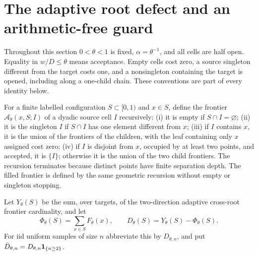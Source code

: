 \documentclass[11pt]{article}
\numberwithin{equation}{section}
\newcommand{\1}{\mathbf 1}\newcommand{\F}{\mathcal F}\newcommand{\D}{\mathcal D}
\begin{document}
\section{The adaptive root defect and an arithmetic-free guard}
\label{sec:adaptive-guard-dossier}

Throughout this section $0<\theta<1$ is fixed, $\alpha=\theta^{-1}$, and
all cells are half open.  Equality in $w/D\leq\theta$ means acceptance.  Empty
cells cost zero, a source singleton different from the target costs one, and
a nonsingleton containing the target is opened, including along a one-child
chain.  These conventions are part of every identity below.

For a finite labelled configuration $S\subset[0,1)$ and $x\in S$, define the
frontier $\mathcal A_\theta(x,S;I)$ of a dyadic source cell $I$ recursively:
(i) it is empty if $S\cap I=\varnothing$; (ii) it is the singleton $I$ if
$S\cap I$ has one element different from $x$; (iii) if $I$ contains $x$, it
is the union of the frontiers of the children, with the leaf containing only
$x$ assigned cost zero; (iv) if $I$ is disjoint from $x$, occupied by at least
two points, and accepted, it is $\{I\}$; otherwise it is the union of the two
child frontiers.  The recursion terminates because distinct points have finite
separation depth.  The filled frontier is defined by the same geometric
recursion without empty or singleton stopping.

Let $Y_\theta(S)$ be the sum, over targets, of the two-direction adaptive
cross-root frontier cardinality, and let
\begin{equation}
 \Phi_\theta(S)=\sum_{x\in S}F_\theta(x),\qquad
 D_\theta(S)=Y_\theta(S)-\Phi_\theta(S).                 \label{eq:defect-def}
\end{equation}
For iid uniform samples of size $n$ abbreviate this by $D_{\theta,n}$, and put
$\bar D_{\theta,n}=D_{\theta,n}{\bf1}_{\{n\ge2\}}$.
\end{document}
